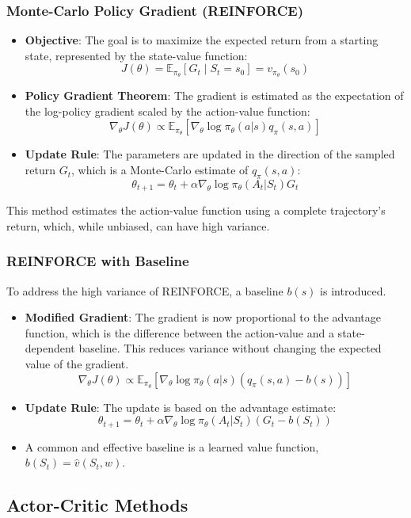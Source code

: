 \documentclass[12pt]{article}
\begin{document}
\subsubsection{Monte-Carlo Policy Gradient (REINFORCE)}
\begin{itemize}
    \item \textbf{Objective}: The goal is to maximize the expected return from a starting state, represented by the state-value function:
    $$ J(\theta) = \mathbb{E}_{\pi_\theta}[G_t \mid S_t = s_0] = v_{\pi_\theta}(s_0) $$
    \item \textbf{Policy Gradient Theorem}: The gradient is estimated as the expectation of the log-policy gradient scaled by the action-value function:
    $$ \nabla_\theta J(\theta) \propto \mathbb{E}_{\pi_\theta} [\nabla_\theta \log \pi_\theta(a|s) q_\pi(s,a)] $$
    \item \textbf{Update Rule}: The parameters are updated in the direction of the sampled return $G_t$, which is a Monte-Carlo estimate of $q_\pi(s,a)$:
    $$ \theta_{t+1} = \theta_t + \alpha \nabla_\theta \log \pi_\theta(A_t|S_t) G_t $$
\end{itemize}
This method estimates the action-value function using a complete trajectory's return, which, while unbiased, can have high variance.

\subsubsection{REINFORCE with Baseline}
To address the high variance of REINFORCE, a baseline $b(s)$ is introduced.
\begin{itemize}
    \item \textbf{Modified Gradient}: The gradient is now proportional to the advantage function, which is the difference between the action-value and a state-dependent baseline. This reduces variance without changing the expected value of the gradient.
    $$ \nabla_\theta J(\theta) \propto \mathbb{E}_{\pi_\theta} [\nabla_\theta \log \pi_\theta(a|s) (q_\pi(s,a) - b(s))] $$
    \item \textbf{Update Rule}: The update is based on the advantage estimate:
    $$ \theta_{t+1} = \theta_t + \alpha \nabla_\theta \log \pi_\theta(A_t|S_t) (G_t - b(S_t)) $$
    \item A common and effective baseline is a learned value function, $b(S_t) = \hat{v}(S_t, w)$.
\end{itemize}

\subsection{Actor-Critic Methods}
\end{document}
